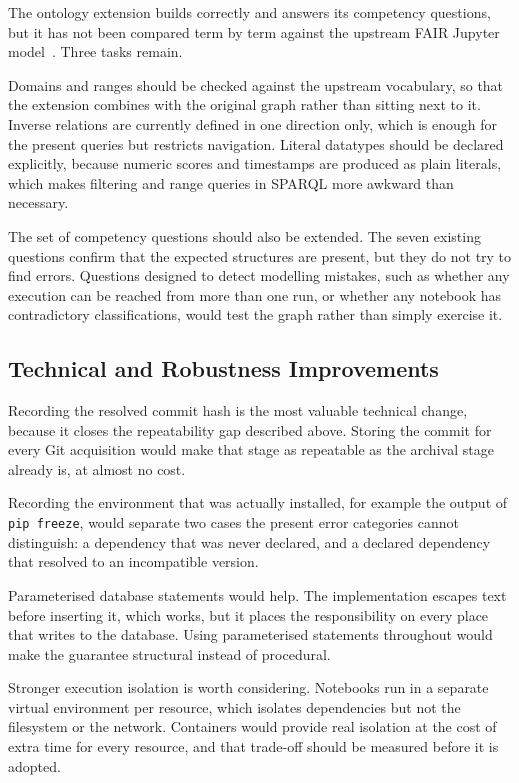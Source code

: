 The ontology extension builds correctly and answers its competency questions, but it has not been compared term by term against the upstream FAIR Jupyter model~\cite{samuel2024fairjupyter}. Three tasks remain.

Domains and ranges should be checked against the upstream vocabulary, so that the extension combines with the original graph rather than sitting next to it. Inverse relations are currently defined in one direction only, which is enough for the present queries but restricts navigation. Literal datatypes should be declared explicitly, because numeric scores and timestamps are produced as plain literals, which makes filtering and range queries in SPARQL more awkward than necessary.

The set of competency questions should also be extended. The seven existing questions confirm that the expected structures are present, but they do not try to find errors. Questions designed to detect modelling mistakes, such as whether any execution can be reached from more than one run, or whether any notebook has contradictory classifications, would test the graph rather than simply exercise it.

\subsection{Technical and Robustness Improvements}
\label{sec:future-technical}

Recording the resolved commit hash is the most valuable technical change, because it closes the repeatability gap described above. Storing the commit for every Git acquisition would make that stage as repeatable as the archival stage already is, at almost no cost.

Recording the environment that was actually installed, for example the output of \texttt{pip freeze}, would separate two cases the present error categories cannot distinguish: a dependency that was never declared, and a declared dependency that resolved to an incompatible version.

Parameterised database statements would help. The implementation escapes text before inserting it, which works, but it places the responsibility on every place that writes to the database. Using parameterised statements throughout would make the guarantee structural instead of procedural.

Stronger execution isolation is worth considering. Notebooks run in a separate virtual environment per resource, which isolates dependencies but not the filesystem or the network. Containers would provide real isolation at the cost of extra time for every resource, and that trade-off should be measured before it is adopted.

